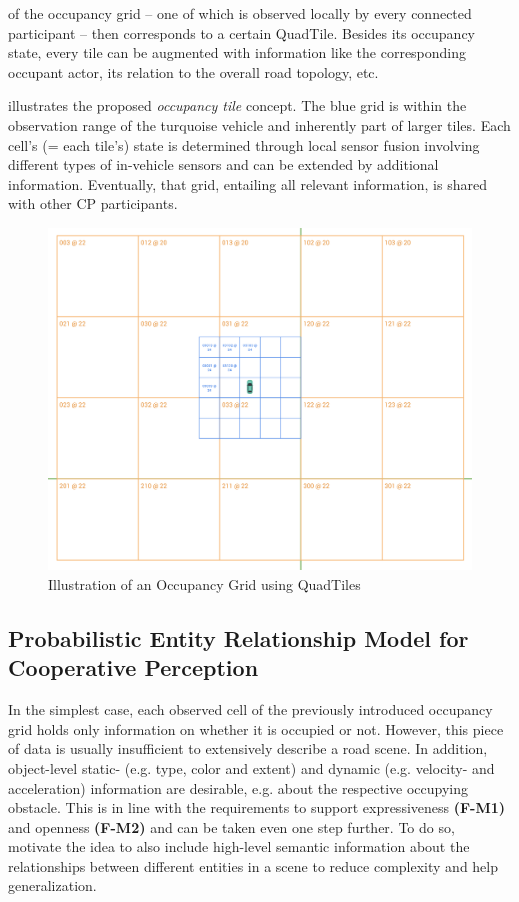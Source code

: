  of the occupancy grid – one of which is observed locally by every connected participant – then corresponds to a certain QuadTile. Besides its occupancy state, every tile can be augmented with information like the corresponding occupant actor, its relation to the overall road topology, etc. 

 illustrates the proposed \textit{occupancy tile} concept. The blue grid is within the observation range of the turquoise vehicle and inherently part of larger tiles. Each cell's (= each tile's) state is determined through local sensor fusion involving different types of in-vehicle sensors and can be extended by additional information. Eventually, that grid, entailing all relevant information, is shared with other CP participants.

\begin{figure}[h]
	\centering
	\includegraphics[width=1.0\linewidth]{98_images/geo_subscription_schema_1}
	\caption{Illustration of an Occupancy Grid using QuadTiles}
	\label{fig:tiling1}
\end{figure}


\subsection{Probabilistic Entity Relationship Model for Cooperative Perception}
\label{subsec:concept_design:probabilistic_entity_relationship_model_for_cooperative_perception}

In the simplest case, each observed cell of the previously introduced occupancy grid holds only information on whether it is occupied or not. However, this  piece of data is usually insufficient to extensively describe a road scene. In addition, object-level static- (e.g. type, color and extent) and dynamic (e.g. velocity- and acceleration) information are desirable, e.g. about the respective occupying obstacle. This is in line with the requirements to support expressiveness \textbf{(F-M1)} and openness \textbf{(F-M2)} and can be taken even one step further. To do so, \cite{Kohlhaas2014, Petrich2018} motivate the idea to also include high-level semantic information about the relationships between different entities in a scene to reduce complexity and help generalization. 

